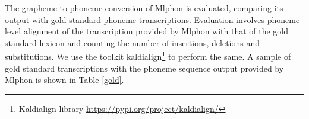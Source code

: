 \documentclass{ieeeaccess}
\begin{document}
The grapheme to phoneme conversion of Mlphon is evaluated, comparing its output with gold standard phoneme transcriptions. Evaluation involves phoneme level alignment of the transcription provided by Mlphon with that of the gold standard lexicon and counting the number of insertions, deletions and substitutions. We use the toolkit kaldialign\footnote{Kaldialign library \url{https://pypi.org/project/kaldialign/}} to perform the same. A sample of gold standard transcriptions with the phoneme sequence output provided by Mlphon is shown in Table \ref{gold}. 
\end{document}
